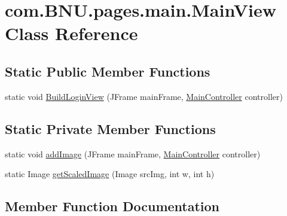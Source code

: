 \hypertarget{classcom_1_1_b_n_u_1_1pages_1_1main_1_1_main_view}{}\section{com.\+B\+N\+U.\+pages.\+main.\+Main\+View Class Reference}
\label{classcom_1_1_b_n_u_1_1pages_1_1main_1_1_main_view}
\subsection*{Static Public Member Functions}
\begin{DoxyCompactItemize}
\item 
static void \mbox{\hyperlink{classcom_1_1_b_n_u_1_1pages_1_1main_1_1_main_view_af86bcf96d11de189420b0346b76c051a}{Build\+Login\+View}} (J\+Frame main\+Frame, \mbox{\hyperlink{classcom_1_1_b_n_u_1_1pages_1_1main_1_1_main_controller}{Main\+Controller}} controller)
\end{DoxyCompactItemize}
\subsection*{Static Private Member Functions}
\begin{DoxyCompactItemize}
\item 
static void \mbox{\hyperlink{classcom_1_1_b_n_u_1_1pages_1_1main_1_1_main_view_a73ea686d365617ae00f203e484a59e17}{add\+Image}} (J\+Frame main\+Frame, \mbox{\hyperlink{classcom_1_1_b_n_u_1_1pages_1_1main_1_1_main_controller}{Main\+Controller}} controller)
\item 
static Image \mbox{\hyperlink{classcom_1_1_b_n_u_1_1pages_1_1main_1_1_main_view_a618c443606868e8c1e6637cddcef9cad}{get\+Scaled\+Image}} (Image src\+Img, int w, int h)
\end{DoxyCompactItemize}


\subsection{Member Function Documentation}
\mbox{\label{classcom_1_1_b_n_u_1_1pages_1_1main_1_1_main_view_a73ea686d365617ae00f203e484a59e17}} 
